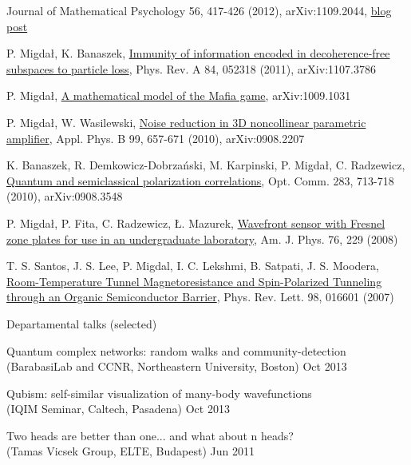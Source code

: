 \documentclass[margin,line]{resume}
\begin{document}
\begin{resume}
\begin{list2}
        Journal of Mathematical Psychology 56, 417-426 (2012),
        arXiv:1109.2044,
        \href{http://egtheory.wordpress.com/2014/01/30/two-heads-are-better-than-one-how-about-more/}{blog post}
        \item P. Migdał, K. Banaszek, \href{http://arxiv.org/abs/1107.3786}{Immunity of information encoded in decoherence-free subspaces to particle loss}, Phys. Rev. A 84, 052318 (2011), arXiv:1107.3786
    	\item P. Migdał, \href{http://arxiv.org/abs/1009.1031}{A mathematical model of the Mafia game}, arXiv:1009.1031
        \item P. Migdał, W. Wasilewski, \href{http://dx.doi.org/10.1007/s00340-010-3915-z}{Noise reduction in 3D noncollinear parametric amplifier}, Appl. Phys. B 99, 657-671 (2010), arXiv:0908.2207
        \item K. Banaszek, R. Demkowicz-Dobrzański, M. Karpinski, P. Migdał, C. Radzewicz, \href{http://arxiv.org/abs/0908.3548}{Quantum and semiclassical polarization correlations}, Opt. Comm. 283, 713-718 (2010), arXiv:0908.3548
        \item P. Migdał, P. Fita, C. Radzewicz, Ł. Mazurek, \href{http://ultrafast.fuw.edu.pl/publications/ajp_2008.pdf}{Wavefront sensor with Fresnel zone plates for use in an undergraduate laboratory}, Am. J. Phys. 76, 229 (2008)
        \item T. S. Santos, J. S. Lee, P. Migdal, I. C. Lekshmi, B. Satpati, J. S. Moodera, \href{http://dx.doi.org/10.1103/PhysRevLett.98.016601}{Room-Temperature Tunnel Magnetoresistance and Spin-Polarized Tunneling through an Organic Semiconductor Barrier}, Phys. Rev. Lett. 98, 016601 (2007)
    \end{list2}

\newpage


    Departamental talks (selected)
    \begin{list2}
        \item Quantum complex networks: random walks and community-detection\\
        (BarabasiLab and CCNR, Northeastern University, Boston) \hfill Oct 2013
        \item Qubism: self-similar visualization of many-body wavefunctions\\
        (IQIM Seminar, Caltech, Pasadena) \hfill Oct 2013
        \item Two heads are better than one... and what about n heads?\\
        (Tamas Vicsek Group, ELTE, Budapest) \hfill Jun 2011
    \end{list2}


\end{resume}
\end{document}
